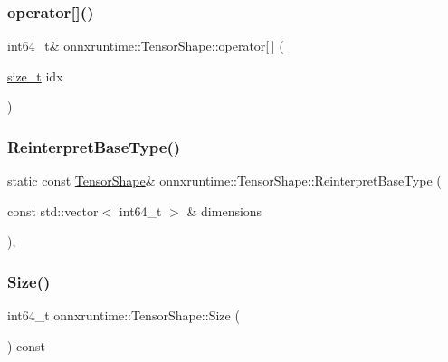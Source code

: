 \subsubsection{\texorpdfstring{operator[]()}{operator[]()}\hspace{0.1cm}{\footnotesize\ttfamily [2/2]}}
{\footnotesize\ttfamily int64\+\_\+t\& onnxruntime\+::\+Tensor\+Shape\+::operator\mbox{[}$\,$\mbox{]} (\begin{DoxyParamCaption}\item[{\mbox{\hyperlink{mlasi_8h_a503efbc1c6e50825320ad909366b78ab}{size\+\_\+t}}}]{idx }\end{DoxyParamCaption})\hspace{0.3cm}{\ttfamily [inline]}}

\mbox{\label{classonnxruntime_1_1TensorShape_ac7df37b3db58eb9e1847986b89fd2c6f}} 
\subsubsection{\texorpdfstring{Reinterpret\+Base\+Type()}{ReinterpretBaseType()}}
{\footnotesize\ttfamily static const \mbox{\hyperlink{classonnxruntime_1_1TensorShape}{Tensor\+Shape}}\& onnxruntime\+::\+Tensor\+Shape\+::\+Reinterpret\+Base\+Type (\begin{DoxyParamCaption}\item[{const std\+::vector$<$ int64\+\_\+t $>$ \&}]{dimensions }\end{DoxyParamCaption})\hspace{0.3cm}{\ttfamily [inline]}, {\ttfamily [static]}}

\mbox{\label{classonnxruntime_1_1TensorShape_a01f6e6fbc270702141c4c45573667cd5}} 
\subsubsection{\texorpdfstring{Size()}{Size()}}
{\footnotesize\ttfamily int64\+\_\+t onnxruntime\+::\+Tensor\+Shape\+::\+Size (\begin{DoxyParamCaption}{ }\end{DoxyParamCaption}) const}

